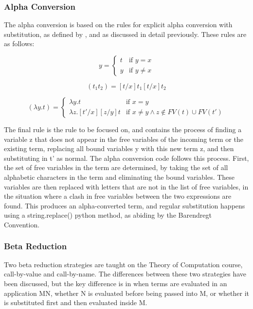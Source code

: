 \documentclass[a4paper,12pt]{report}
\begin{document}
\subsubsection{Alpha Conversion}
The alpha conversion is based on the rules for explicit alpha conversion with substitution, as defined by \cite{Acar2008}, and as discussed in detail previously. These rules are as follows:

\begin{equation}
[t/x]y=\begin{cases}
t & \text{if $y=x$}\\
y & \text{if $y\ne x$}
\end{cases}
\end{equation}

\begin{equation}
[t/x](t_1t_2)=[t/x]t_1[t/x]t_2
\end{equation}

\begin{equation}
[t'/x](\lambda y.t)=\begin{cases}
\lambda y.t & \text{if $x=y$}\\
\lambda z.[t'/x][z/y]t & \text{if $x\ne y \land z\notin FV(t) \cup FV(t')$}
\end{cases}
\end{equation}

The final rule is the rule to be focused on, and contains the process of finding a variable z that does not appear in the free variables of the incoming term or the existing term, replacing all bound variables y with this new term z, and then substituting in t’ as normal.
The alpha conversion code follows this process. First, the set of free variables in the term are determined, by taking the set of all alphabetic characters in the term and eliminating the bound variables. These variables are then replaced with letters that are not in the list of free variables, in the situation where a clash in free variables between the two expressions are found. This produces an alpha-converted term, and regular substitution happens using a string.replace() python method, as abiding by the Barendregt Convention.

\subsubsection{Beta Reduction}

Two beta reduction strategies are taught on the Theory of Computation course, call-by-value and call-by-name. The differences between these two strategies have been discussed, but the key difference is in when terms are evaluated in an application MN, whether N is evaluated before being passed into M, or whether it is substituted first and then evaluated inside M.
\end{document}
